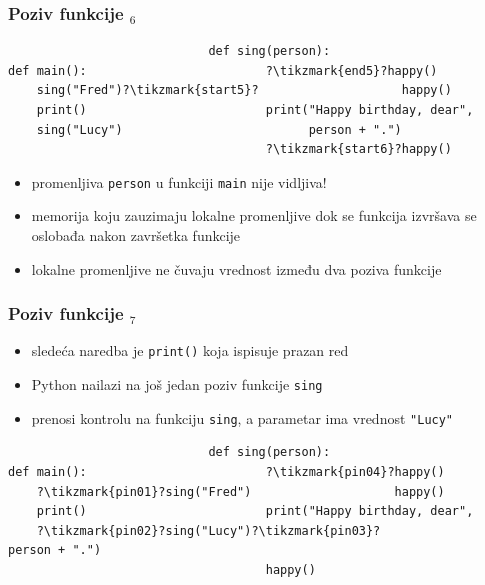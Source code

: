 \documentclass[compress]{beamer}
\begin{document}
\begin{frame}[fragile]
  \frametitle{Poziv funkcije $_6$}
\begin{verbatim}
                            def sing(person):
def main():                         ?\tikzmark{end5}?happy()
    sing("Fred")?\tikzmark{start5}?                    happy()
    print()                         print("Happy birthday, dear", 
    sing("Lucy")                          person + ".")
                                    ?\tikzmark{start6}?happy()
\end{verbatim}
\begin{itemize}
    \item promenljiva \texttt{person} u funkciji \texttt{main} nije vidljiva!
    \item memorija koju zauzimaju lokalne promenljive dok se funkcija izvršava se oslobađa nakon završetka funkcije
    \item lokalne promenljive ne čuvaju vrednost između dva poziva funkcije
  \end{itemize}
\end{frame}

\begin{frame}[fragile]
  \frametitle{Poziv funkcije $_7$}
  \begin{itemize}
    \item sledeća naredba je \texttt{print()} koja ispisuje prazan red
    \item Python nailazi na još jedan poziv funkcije \texttt{sing}
    \item prenosi kontrolu na funkciju \texttt{sing}, a parametar ima vrednost \texttt{"Lucy"}
  \end{itemize}
\begin{verbatim}
                            def sing(person):
def main():                         ?\tikzmark{pin04}?happy()
    ?\tikzmark{pin01}?sing("Fred")                    happy()
    print()                         print("Happy birthday, dear", 
    ?\tikzmark{pin02}?sing("Lucy")?\tikzmark{pin03}?                          person + ".")
                                    happy()
\end{verbatim}
\end{frame}
\end{document}
